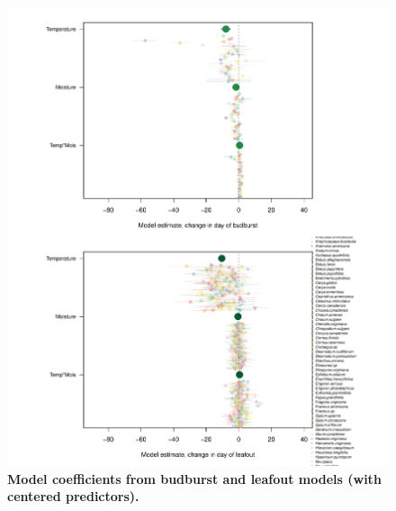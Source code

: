 \documentclass{article}
\begin{document}
\begin{figure}[h]
\centering
 \includegraphics{../../Analyses/soilmoisture/figures/m5_bbdlo_.pdf}
 \caption{\textbf{Model coefficients from budburst and leafout models (with centered predictors).}} 
 \label{fig:bblo}
 \end{figure}
 
\end{document}
